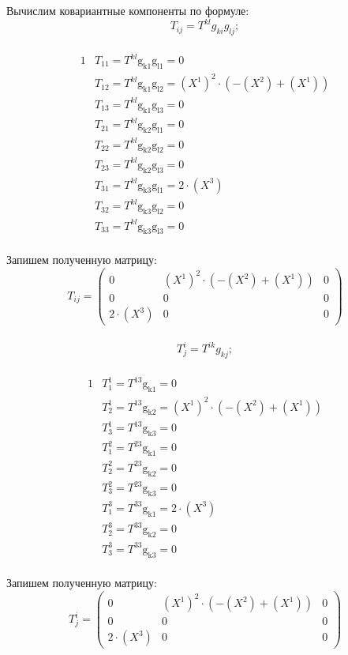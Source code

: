 \documentclass{article}
\begin{document}
Вычислим ковариантные компоненты по формуле:\\
\[
T_{ij} = T^{kl}g_{ki}g_{lj};
\]\\
\begin{alignat*}{1}
  & T_{11} = T^{kl}\mathrm{g_{k1}g_{l1} = }0 \\
  & T_{12} = T^{kl}\mathrm{g_{k1}g_{l2} = }(X^1)^2\cdot (-(X^2) + (X^1)) \\
  & T_{13} = T^{kl}\mathrm{g_{k1}g_{l3} = }0 \\
  & T_{21} = T^{kl}\mathrm{g_{k2}g_{l1} = }0 \\
  & T_{22} = T^{kl}\mathrm{g_{k2}g_{l2} = }0 \\
  & T_{23} = T^{kl}\mathrm{g_{k2}g_{l3} = }0 \\
  & T_{31} = T^{kl}\mathrm{g_{k3}g_{l1} = }2\cdot (X^3) \\
  & T_{32} = T^{kl}\mathrm{g_{k3}g_{l2} = }0 \\
  & T_{33} = T^{kl}\mathrm{g_{k3}g_{l3} = }0 
\end{alignat*}\\
Запишем полученную матрицу:\\
\[
T_{ij}=\begin{pmatrix}
	0 & (X^1)^2\cdot (-(X^2) + (X^1)) & 0\\
	0 & 0 & 0\\
	2\cdot (X^3) & 0 & 0
\end{pmatrix}
\]\\
\[
T^i_j = T^{ik}g_{kj};
\]\\
\begin{alignat*}{1}
  & T^1_1 = T^{13}\mathrm{g_{k1} = }0 \\
  & T^1_2 = T^{13}\mathrm{g_{k2} = }(X^1)^2\cdot (-(X^2) + (X^1)) \\
  & T^1_3 = T^{13}\mathrm{g_{k3} = }0 \\
  & T^2_1 = T^{23}\mathrm{g_{k1} = }0 \\
  & T^2_2 = T^{23}\mathrm{g_{k2} = }0 \\
  & T^2_3 = T^{23}\mathrm{g_{k3} = }0 \\
  & T^3_1 = T^{33}\mathrm{g_{k1} = }2\cdot (X^3) \\
  & T^3_2 = T^{33}\mathrm{g_{k2} = }0 \\
  & T^3_3 = T^{33}\mathrm{g_{k3} = }0 
\end{alignat*}\\
Запишем полученную матрицу:\\
\[
T^i_j=\begin{pmatrix}
	0 & (X^1)^2\cdot (-(X^2) + (X^1)) & 0\\
	0 & 0 & 0\\
	2\cdot (X^3) & 0 & 0
\end{pmatrix}
\]\\
\end{document}
